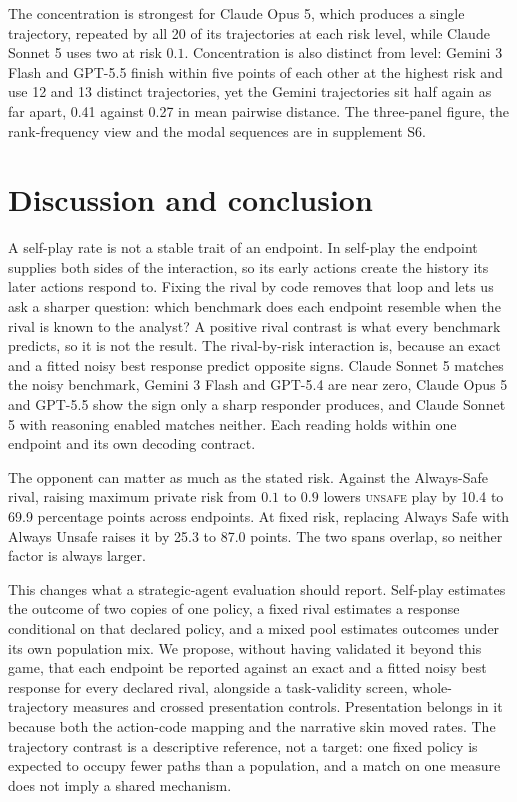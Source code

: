 \documentclass{article}
\newcommand{\Unsafe}{\textsc{unsafe}}
\begin{document}
The concentration is strongest for Claude Opus 5, which produces a single
trajectory, repeated by all 20 of its trajectories at each risk level, while
Claude Sonnet 5 uses two at risk $0.1$. Concentration is also distinct from
level: Gemini 3 Flash and GPT-5.5 finish within five points of each other at the
highest risk and use 12 and 13 distinct trajectories, yet the Gemini trajectories
sit half again as far apart, 0.41 against 0.27 in mean pairwise distance. The
three-panel figure, the rank-frequency view and the modal sequences are in
supplement S6.

\section{Discussion and conclusion}
\label{sec:discussion}

A self-play rate is not a stable trait of an endpoint. In self-play the
endpoint supplies both sides of the interaction, so its early actions create
the history its later actions respond to. Fixing the rival by code removes that
loop and lets us ask a sharper question: which benchmark does each endpoint
resemble when the rival is known to the analyst? A positive rival contrast is
what every benchmark predicts, so it is not the result. The rival-by-risk
interaction is, because an exact and a fitted noisy best response predict
opposite signs. Claude Sonnet 5 matches the noisy benchmark, Gemini 3 Flash and
GPT-5.4 are near zero, Claude Opus 5 and GPT-5.5 show the sign only a sharp
responder produces, and Claude Sonnet 5 with reasoning enabled matches neither. Each reading holds
within one endpoint and its own decoding contract.

The opponent can matter as much as the stated risk. Against the
Always-Safe rival, raising maximum private risk from $0.1$ to $0.9$ lowers
\Unsafe{} play by 10.4 to 69.9 percentage points across endpoints. At fixed
risk, replacing Always Safe with Always Unsafe raises it by 25.3 to 87.0 points.
The two spans overlap, so neither factor is always larger.

This changes what a strategic-agent evaluation should report. Self-play
estimates the outcome of two copies of one policy, a fixed rival estimates a
response conditional on that declared policy, and a mixed pool estimates
outcomes under its own population mix. We propose, without having validated it
beyond this game, that each endpoint be reported against an exact and a fitted noisy best
response for every declared rival, alongside a task-validity screen,
whole-trajectory measures and crossed presentation controls. Presentation
belongs in it because both the action-code mapping and the narrative skin moved
rates. The trajectory contrast is a descriptive reference, not a target: one
fixed policy is expected to occupy fewer paths than a population, and a match on
one measure does not imply a shared mechanism.
\end{document}
